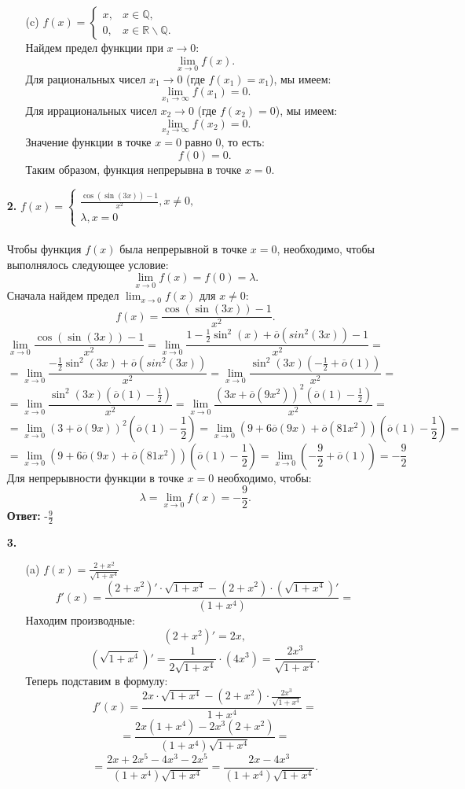 \documentclass[a4paper]{article}
\renewcommand{\f}[2]{\frac{#1}{#2}}
\newcommand{\case}[1]{\begin{cases} #1 \end{cases}}
\newcommand{\oo}{\overline{o}}
\begin{document}
\begin{enumerate}
\begin{enumerate}
        \item[(c)]$f(x) = \begin{cases}
            x, & x \in \mathbb{Q}, \\
            0, & x \in \mathbb{R} \backslash \mathbb{Q}.
        \end{cases}$\\
        Найдем предел функции при $ x \to 0 $:
        $$
        \lim_{x \to 0} f(x).
        $$
        Для рациональных чисел $ x_1 \to 0 $ (где $ f(x_1) = x_1 $), мы имеем:
        $$
        \lim_{x_1 \to \infty} f(x_1) = 0.
        $$
        Для иррациональных чисел $ x_2 \to 0 $ (где $ f(x_2) = 0 $), мы имеем:
        $$
        \lim_{x_2 \to \infty} f(x_2) = 0.
        $$
        Значение функции в точке $ x = 0 $ равно 0, то есть:
        $$
        f(0) = 0.
        $$
        Таким образом, функция непрерывна в точке $ x = 0 $.\\
    \end{enumerate}
    \item[\textbf{2.}]$f(x) = \case{
        \frac{\cos(\sin(3x)) - 1}{x^2},x \neq 0, \\
        \lambda, x=0 
    }$\\\\
    Чтобы функция $ f(x) $ была непрерывной в точке $ x=0 $, необходимо, чтобы выполнялось следующее условие:
    $$
    \lim_{x \to 0} f(x) = f(0) = \lambda.
    $$
    Сначала найдем предел $ \lim_{x \to 0} f(x) $ для $ x \neq 0 $:
    $$
    f(x) = \frac{\cos(\sin(3x)) - 1}{x^2}.
    $$
    $$\lim_{x \to 0}\frac{\cos(\sin(3x)) - 1}{x^2} = \lim_{x \to 0}\f{1 - \f{1}{2}\sin^2(x) + \oo(sin^2(3x)) -1}{x^2} = $$
    $$=\lim_{x \to 0}\f{-\f{1}{2}\sin^2(3x) + \oo(sin^2(3x))}{x^2} = \lim_{x \to 0}\f{\sin^2(3x)(-\f{1}{2} + \oo(1))}{x^2} =$$ 
    $$=\lim_{x \to 0}\f{\sin^2(3x)(\oo(1)-\f{1}{2})}{x^2} =\lim_{x \to 0}\f{(3x+\oo(9x^2))^2(\oo(1)-\f{1}{2})}{x^2} = $$
    $$=\lim_{x \to 0}(3+\oo(9x))^2(\oo(1)-\f{1}{2})=\lim_{x \to 0}(9 + 6\oo(9x)+\oo(81x^2))(\oo(1)-\f{1}{2})=$$
    $$=\lim_{x \to 0}(9 + 6\oo(9x)+\oo(81x^2))(\oo(1)-\f{1}{2})=\lim_{x \to 0}(-\f{9}{2}+\oo(1)) = -\f{9}{2}$$
    Для непрерывности функции в точке $ x=0 $ необходимо, чтобы:
    $$
    \lambda = \lim_{x \to 0} f(x) = -\frac{9}{2}.
    $$
    \textbf{Ответ: }-$\f{9}{2}$

    \item[\textbf{3.}]\begin{enumerate}
        \item[(a)]$f(x) = \frac{2 + x^2}{\sqrt{1 + x^4}} $
        $$f'(x) = \frac{(2 + x^2)' \cdot \sqrt{1 + x^4} - (2 + x^2) \cdot (\sqrt{1 + x^4})'}{(1 + x^4)} = $$
        Находим производные:
        $$(2 + x^2)' = 2x,$$
        $$(\sqrt{1 + x^4})' = \frac{1}{2\sqrt{1 + x^4}} \cdot (4x^3) = \frac{2x^3}{\sqrt{1 + x^4}}.$$
        Теперь подставим в формулу:
        $$
        f'(x) = \frac{2x \cdot \sqrt{1 + x^4} - (2 + x^2) \cdot \frac{2x^3}{\sqrt{1 + x^4}}}{1 + x^4}= $$
        $$=\frac{2x(1 + x^4) - 2x^3(2 + x^2)}{(1 + x^4)\sqrt{1 + x^4}} =$$
        $$= \frac{2x + 2x^5 - 4x^3 - 2x^5}{(1 + x^4)\sqrt{1 + x^4}} = \frac{2x - 4x^3}{(1 + x^4)\sqrt{1 + x^4}}.
        $$\\


\end{enumerate}
\end{enumerate}
\end{document}

